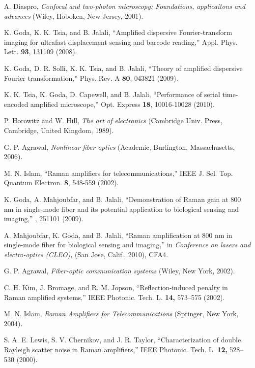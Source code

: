 \documentclass[10pt,letterpaper]{article}
\begin{document}
\begin{thebibliography}{99}
 A. Diaspro, {\it Confocal and two-photon microscopy: Foundations, applicaitons and advances} (Wiley, Hoboken, New Jersey, 2001).

 K. Goda, K. K. Tsia, and B. Jalali, ``Amplified dispersive Fourier-transform imaging for ultrafast displacement sensing and barcode reading,'' Appl. Phys. Lett. {\bf 93}, 131109 (2008).

 K. Goda, D. R. Solli, K. K. Tsia, and B. Jalali, ``Theory of amplified dispersive Fourier transformation,'' Phys. Rev. A {\bf 80}, 043821 (2009). 

 K. K. Tsia, K. Goda, D. Capewell, and B. Jalali, ``Performance of serial time-encoded amplified microscope,'' Opt. Express {\bf 18}, 10016-10028 (2010).

 P. Horowitz and W. Hill, {\it The art of electronics} (Cambridge Univ. Press, Cambridge, United Kingdom, 1989).

 G. P. Agrawal, {\it Nonlinear fiber optics} (Academic, Burlington, Massachusetts, 2006).

 M. N. Islam, ``Raman amplifiers for telecommunications,'' IEEE J. Sel. Top. Quantum Electron. {\bf 8}, 548-559 (2002).

 K. Goda, A. Mahjoubfar, and B. Jalali, ``Demonstration of Raman gain at 800 nm in single-mode fiber and its potential application to biological sensing and imaging,'' , 251101 (2009).

 A. Mahjoubfar, K. Goda, and B. Jalali, ``Raman amplification at 800 nm in single-mode fiber for biological sensing and imaging,'' in {\it Conference on lasers and electro-optics (CLEO),} (San Jose, Calif., 2010), CFA4.

 G. P. Agrawal, {\it Fiber-optic communication systems} (Wiley, New York, 2002).

 C. H. Kim, J. Bromage, and R. M. Jopson, ``Reflection-induced penalty in Raman amplified systems,'' IEEE Photonic. Tech. L. {\bf 14,} 573--575 (2002).

 M. N. Islam, {\it Raman Amplifiers for Telecommunications} (Springer, New York, 2004).

 S. A. E. Lewis, S. V. Chernikov, and J. R. Taylor, ``Characterization of double Rayleigh scatter noise in Raman amplifiers,'' IEEE Photonic. Tech. L. {\bf 12,} 528--530 (2000).


\end{thebibliography}
\end{document}
